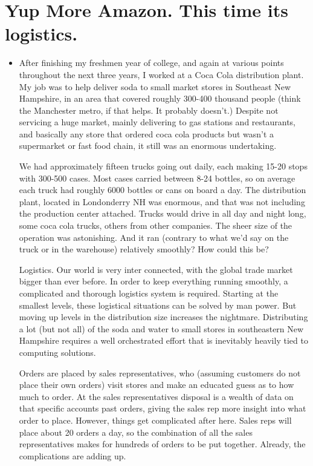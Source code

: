 \documentclass[12pt,twoside]{book}
\begin{document}
	\chapter{Yup More Amazon.  This time its logistics.}
\begin{itemize}
	\item After finishing my freshmen year of college, and again at various points throughout the next three years, I worked at a Coca Cola distribution plant.  My job was to help deliver soda to small market stores in Southeast New Hampshire, in an area that covered roughly 300-400 thousand people (think the Manchester metro, if that helps.  It probably doesn't.)  Despite not servicing a huge market, mainly delivering to gas stations and restaurants, and basically any store that ordered coca cola products but wasn't a supermarket or fast food chain, it still was an enormous undertaking.  
	
	We had approximately fifteen trucks going out daily, each making 15-20 stops with 300-500 cases.  Most cases carried between 8-24 bottles, so on average each truck had roughly 6000 bottles or cans on board a day.  The distribution plant, located in Londonderry NH was enormous, and that was not including the production center attached.  Trucks would drive in all day and night long, some coca cola trucks, others from other companies.  The sheer size of the operation was astonishing.  And it ran (contrary to what we'd say on the truck or in the warehouse) relatively smoothly?  How could this be?
	
	Logistics.  Our world is very inter connected, with the global trade market bigger than ever before.  In order to keep everything running smoothly, a complicated and thorough logistics system is required.  Starting at the smallest levels, these logistical situations can be solved by man power.  But moving up levels in the distribution size increases the nightmare.  Distributing a lot (but not all) of the soda and water to small stores in southeastern New Hampshire requires a well orchestrated effort that is inevitably heavily tied to computing solutions.  
	
	Orders are placed by sales representatives, who (assuming customers do not place their own orders) visit stores and make an educated guess as to how much to order.  At the sales representatives disposal is a wealth of data on that specific accounts past orders, giving the sales rep more insight into what order to place.  However, things get complicated after here.  Sales reps will place about 20 orders a day, so the combination of all the sales representatives makes for hundreds of orders to be put together.  Already, the complications are adding up.
	

\end{itemize}
\end{document}
